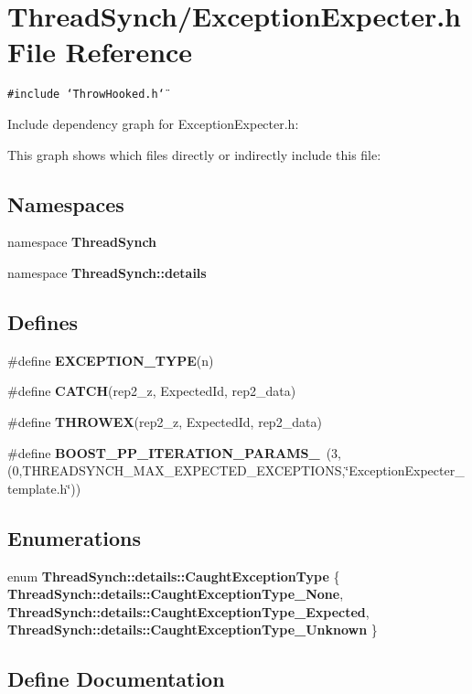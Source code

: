 \section{Thread\-Synch/Exception\-Expecter.h File Reference}
\label{_exception_expecter_8h}
{\tt \#include \char`\"{}Throw\-Hooked.h\char`\"{}}\par


Include dependency graph for Exception\-Expecter.h:

This graph shows which files directly or indirectly include this file:\subsection*{Namespaces}
\begin{CompactItemize}
\item 
namespace {\bf Thread\-Synch}
\item 
namespace {\bf Thread\-Synch::details}
\end{CompactItemize}
\subsection*{Defines}
\begin{CompactItemize}
\item 
\#define {\bf EXCEPTION\_\-TYPE}(n)
\item 
\#define {\bf CATCH}(rep2\_\-z, Expected\-Id, rep2\_\-data)
\item 
\#define {\bf THROWEX}(rep2\_\-z, Expected\-Id, rep2\_\-data)
\item 
\#define {\bf BOOST\_\-PP\_\-ITERATION\_\-PARAMS\_}~(3,(0,THREADSYNCH\_\-MAX\_\-EXPECTED\_\-EXCEPTIONS,\char`\"{}Exception\-Expecter\_\-template.h\char`\"{}))
\end{CompactItemize}
\subsection*{Enumerations}
\begin{CompactItemize}
\item 
enum {\bf Thread\-Synch::details::Caught\-Exception\-Type} \{ {\bf Thread\-Synch::details::Caught\-Exception\-Type\_\-None}, 
{\bf Thread\-Synch::details::Caught\-Exception\-Type\_\-Expected}, 
{\bf Thread\-Synch::details::Caught\-Exception\-Type\_\-Unknown}
 \}
\end{CompactItemize}


\subsection{Define Documentation}
